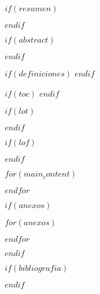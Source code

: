 \documentclass[$if(fontsize)$$fontsize$,$endif$$if(lang)$$lang$,$endif$$if(papersize)$$papersize$,$endif$$for(classoption)$$classoption$$sep$,$endfor$]{$documentclass$}
\renewenvironment{abstract}{
    \newpage
    \null\vfil
    \begin{center}%
        \bfseries \abstractname
    \end{center}
}
{\par\vfil\null\clearpage}
\begin{document}
    $if(resumen)$
        \begin{abstract}
            
        \end{abstract}
        \pagebreak
    $endif$

    $if(abstract)$
        \begin{english}
            \begin{abstract}
                
            \end{abstract}
        \end{english}
        \pagebreak
    $endif$

    $if(definiciones)$
        \printglossary
        \pagebreak
    $endif$

    $if(toc)$
        {
            \hypersetup{linkcolor=black}
            \setcounter{tocdepth}{$toc-depth$}
            \tableofcontents
        }
    $endif$

    $if(lot)$
        \listoftables
    $endif$

    $if(lof)$
        \listoffigures
    $endif$

    \cleardoublepage

    $for(main_content)$
        
        \pagebreak
    $endfor$

    $if(anexos)$
        \begin{appendices}
            $for(anexos)$
                
            $endfor$
        \end{appendices}
    $endif$

    $if(bibliografia)$
        
        \pagebreak
    $endif$
\end{document}
